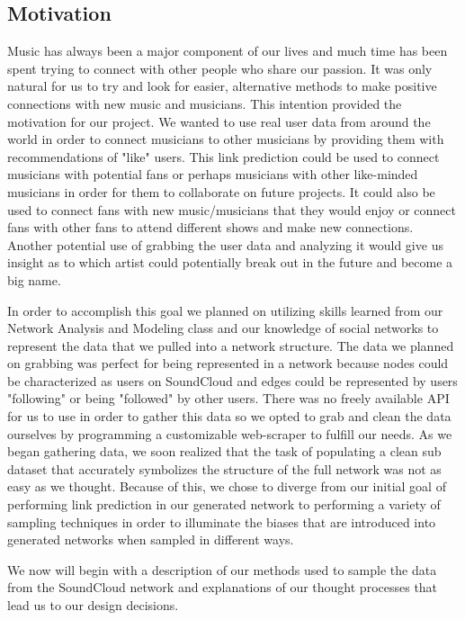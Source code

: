 \documentclass{article}
\begin{document}
\subsection{Motivation}
Music has always been a major component of our lives and much time has been spent trying to connect with other people who share our passion.  It was only natural for us to try and look for easier, alternative methods to make positive connections with new music and musicians.  This intention provided the motivation for our project.  We wanted to use real user data from around the world in order to connect musicians to other musicians by providing them with recommendations of "like" users.  This link prediction could be used to connect musicians with potential fans or perhaps musicians with other like-minded musicians in order for them to collaborate on future projects.  It could also be used to connect fans with new music/musicians that they would enjoy or connect fans with other fans to attend different shows and make new connections.  Another potential use of grabbing the user data and analyzing it would give us insight as to which artist could potentially break out in the future and become a big name.

In order to accomplish this goal we planned on utilizing skills learned from our Network Analysis and Modeling class and our knowledge of social networks to represent the data that we pulled into a network structure.  The data we planned on grabbing was perfect for being represented in a network because nodes could be characterized as users on SoundCloud and edges could be represented by users "following" or being "followed" by other users.  There was no freely available API for us to use in order to gather this data so we opted to grab and clean the data ourselves by programming a customizable web-scraper to fulfill our needs.  As we began gathering data, we soon realized that the task of populating a clean sub dataset that accurately symbolizes the structure of the full network was not as easy as we thought.  Because of this, we chose to diverge from our initial goal of performing link prediction in our generated network to performing a variety of sampling techniques in order to illuminate the biases that are introduced into generated networks when sampled in different ways.

We now will begin with a description of our methods used to sample the data from the SoundCloud network and explanations of our thought processes that lead us to our design decisions.
\end{document}
